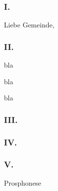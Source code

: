 \documentclass[
    status,
    final,
    dvipsnames,
    ngerman,
    liedertafel,
    verteiler,
    auszuglektor,
    abendmahl,
    beichte,
]{ark-liturgie}
\begin{document}
\begin{predigt}

\subsubsection{I.} %

Liebe Gemeinde,

\begin{predigttextu}
\end{predigttextu}

\subsubsection{II.}

bla

bla

bla

\subsubsection{III.}

\subsubsection{IV.}

\subsubsection{V.}

\end{predigt}

\Abkuendigungen

\HlBEICHTE{}


\HlABENDMAHL{}


\gabenbereitung
\praefation
\Sanctus
\epiklese
\VerbaTestamenti
\GeheimnisDesGlaubens
\anamnese
{}
\Friedensgruss
\AgnusDei
\HauptmannvonKapernaum
{}

\VERKUENDIGUNGundBEKENNTNIS

\begin{AKGu}{Prosphonese}
\end{AKGu}

\SENDUNGundSEGEN

\SendungBenedicamus



\Postludium

\Ablauf
\end{document}
